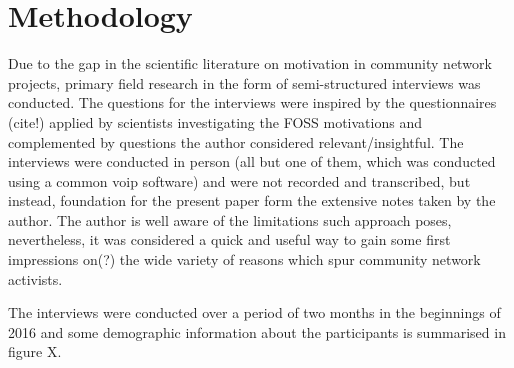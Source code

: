 \section{Methodology}

Due to the gap in the scientific literature on motivation in community network projects, primary field research in the form of semi-structured interviews was conducted.
The questions for the interviews were inspired by the questionnaires (cite!) applied by scientists investigating the FOSS motivations and complemented by questions the author considered relevant/insightful. %
The interviews were conducted in person (all but one of them, which was conducted using a common voip software) and were not recorded and transcribed, but instead, foundation for the present paper form the extensive notes taken by the author. %
The author is well aware of the limitations such approach poses, nevertheless, it was considered a quick and useful way to gain some first impressions on(?) the wide variety of reasons which spur community network activists.

The interviews were conducted over a period of two months in the beginnings of 2016 and some demographic information about the participants is summarised in figure X.


\begin{comment}
\begin{itemize}
  \item literature review for FOSS <-- only as comparison
  \item semi-structured interviews for Freifunk <-- focus
    \begin{itemize}
      \item limitations of the methodology
    \end{itemize}
\end{itemize}
\end{comment}
